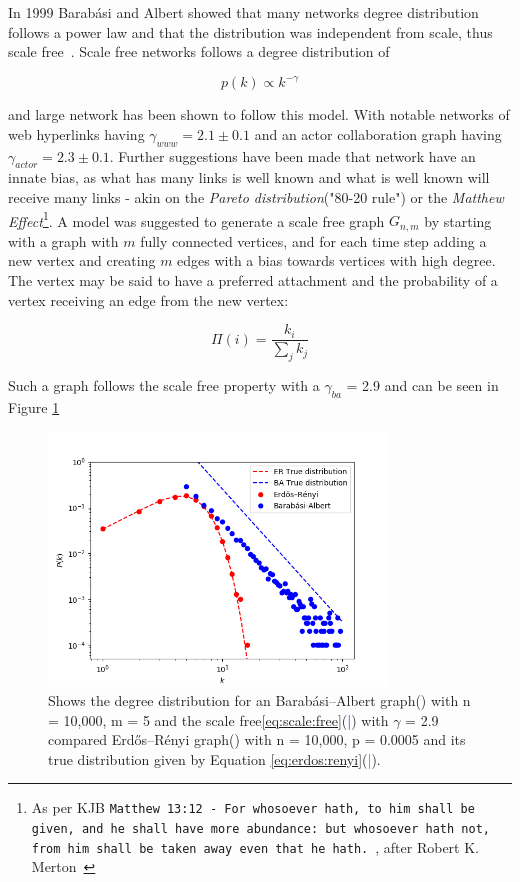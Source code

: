 In 1999 Barabási and Albert showed that many networks \gls{degree distribution} follows a power law and that the distribution was independent from scale, thus scale free~\cite{barabasi:albert:emergent:scaling}. Scale free networks follows a degree distribution of

\begin{equation}
	 p(k) \propto k^{-\gamma} 
	\label{eq:scale:free}
\end{equation}

and large network has been shown to follow this model. With notable networks of web hyperlinks having $\gamma_{www} = 2.1\pm 0.1$ and an actor collaboration graph having $\gamma_{actor} = 2.3\pm0.1$. Further suggestions have been made that network have an innate bias, as what has many links is well known and what is well known will receive many links - akin on the \textit{Pareto distribution}("80-20 rule") or the \textit{Matthew Effect}\footnote{As per KJB \texttt{Matthew 13:12 - For whosoever hath, to him shall be given, and he shall have more abundance: but whosoever hath not, from him shall be taken away even that he hath.}~\cite{king:james:bible}, after Robert K. Merton~\cite{merton:matthew:effect} }. 
A model was suggested to generate a scale free graph $G_{n, m}$ by starting with a graph with $m$ fully connected vertices, and for each time step adding a new vertex and creating $m$ edges with a bias towards vertices with high degree. The vertex may be said to have a preferred attachment and the probability of a vertex receiving an edge from the new vertex:

\[ \Pi(i) = \dfrac{k_i}{\sum_{j}^{}k_j} \]

Such a graph follows the scale free property with a $\gamma_{ba}$ = 2.9 and can be seen in Figure \ref{fig:scale_free}
\newpage
\begin{figure}[!htb]
	\hspace*{-0.5cm} 
	\centering
	\includegraphics[width=9cm]{images/scale_free_degree_distribution.png}
	\caption{Shows the degree distribution for an Barabási–Albert graph(\tikzcircle[blue, fill=blue]{2pt}) with n = 10,000, m = 5 and the scale free\ref{eq:scale:free}(\textcolor{blue}{|}) with $\gamma$ = 2.9 compared Erdős–Rényi graph(\tikzcircle[red, fill=red]{2pt}) with n = 10,000, p = 0.0005 and its true distribution given by Equation \ref{eq:erdos:renyi}(\textcolor{red}{|}).
	}
	\label{fig:scale_free}
	\hspace*{2mm} 
\end{figure}

